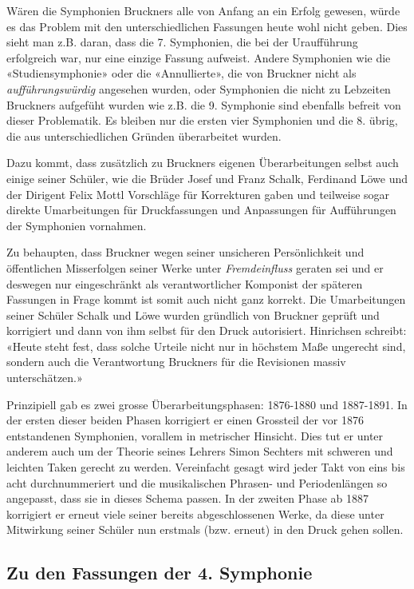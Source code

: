 Wären die Symphonien Bruckners alle von Anfang an ein Erfolg gewesen, würde es das Problem mit den unterschiedlichen Fassungen heute wohl nicht geben.
Dies sieht man z.B. daran, dass die 7. Symphonien, die bei der Uraufführung erfolgreich war, nur eine einzige Fassung aufweist.
Andere Symphonien wie die «Studiensymphonie» oder die «Annullierte», die von Bruckner nicht als \emph{aufführungswürdig} angesehen wurden, oder Symphonien die nicht zu Lebzeiten Bruckners aufgefüht wurden wie z.B. die 9. Symphonie sind ebenfalls befreit von dieser Problematik.
Es bleiben nur die ersten vier Symphonien und die 8. übrig, die aus unterschiedlichen Gründen überarbeitet wurden.

Dazu kommt, dass zusätzlich zu Bruckners eigenen Überarbeitungen selbst auch einige seiner Schüler, wie die Brüder Josef und Franz Schalk, Ferdinand Löwe und der Dirigent Felix Mottl Vorschläge für Korrekturen gaben und teilweise sogar direkte Umarbeitungen für Druckfassungen und Anpassungen für Aufführungen der Symphonien vornahmen.

Zu behaupten, dass Bruckner wegen seiner unsicheren Persönlichkeit und öffentlichen Misserfolgen seiner Werke unter \emph{Fremdeinfluss} geraten sei und er deswegen nur eingeschränkt als verantwortlicher Komponist der späteren Fassungen in Frage kommt ist somit auch nicht ganz korrekt.
Die Umarbeitungen seiner Schüler Schalk und Löwe wurden gründlich von Bruckner geprüft und korrigiert und dann von ihm selbst für den Druck autorisiert.
Hinrichsen schreibt: «Heute steht fest, dass solche Urteile nicht nur in höchstem Maße ungerecht sind, sondern auch die Verantwortung Bruckners für die Revisionen massiv unterschätzen.»\autocite[33]{hinrichsen:bruckner}

Prinzipiell gab es zwei grosse Überarbeitungsphasen: 1876-1880 und 1887-1891.
In der ersten dieser beiden Phasen korrigiert er einen Grossteil der vor 1876 entstandenen Symphonien, vorallem in metrischer Hinsicht.
Dies tut er unter anderem auch um der Theorie seines Lehrers Simon Sechters mit schweren und leichten Taken gerecht zu werden.
Vereinfacht gesagt wird jeder Takt von eins bis acht durchnummeriert und die musikalischen Phrasen- und Periodenlängen so angepasst, dass sie in dieses Schema passen.
In der zweiten Phase ab 1887 korrigiert er erneut viele seiner bereits abgeschlossenen Werke, da diese unter Mitwirkung seiner Schüler nun erstmals (bzw. erneut) in den Druck gehen sollen.


\subsection{Zu den Fassungen der 4. Symphonie}

